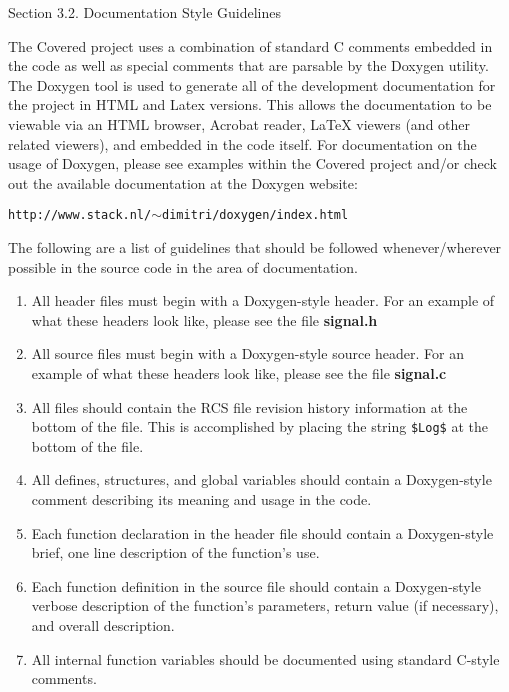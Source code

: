 \begin{Desc}
\item[Section 3.2.  Documentation Style Guidelines]\par
 The Covered project uses a combination of standard C comments embedded in the code as well as special comments that are parsable by the Doxygen utility. The Doxygen tool is used to generate all of the development documentation for the project in HTML and Latex versions. This allows the documentation to be viewable via an HTML browser, Acrobat reader, La\-Te\-X viewers (and other related viewers), and embedded in the code itself. For documentation on the usage of Doxygen, please see examples within the Covered project and/or check out the available documentation at the Doxygen website:

 {\tt http://www.stack.nl/$\sim$dimitri/doxygen/index.html}

 The following are a list of guidelines that should be followed whenever/wherever possible in the source code in the area of documentation.

\begin{enumerate}
\item 
All header files must begin with a Doxygen-style header. For an example of what these  headers look like, please see the file {\bf signal.h}\item 
All source files must begin with a Doxygen-style source header. For an example of what these headers look like, please see the file {\bf signal.c}\item 
All files should contain the RCS file revision history information at the bottom of the file. This is accomplished by placing the string {\tt \$Log\$} at the bottom of the file.\item 
All defines, structures, and global variables should contain a Doxygen-style comment  describing its meaning and usage in the code.\item 
Each function declaration in the header file should contain a Doxygen-style brief, one line description of the function's use.\item 
Each function definition in the source file should contain a Doxygen-style verbose description of the function's parameters, return value (if necessary), and overall description.\item 
All internal function variables should be documented using standard C-style comments.\end{enumerate}
\end{Desc}


